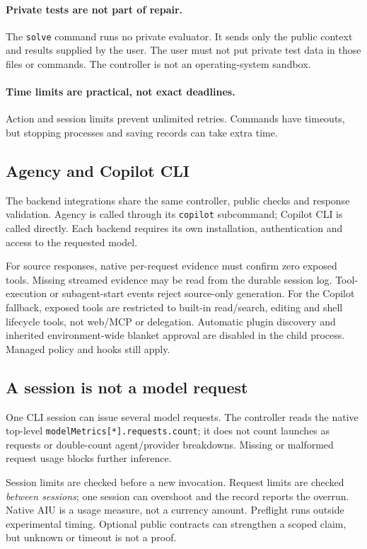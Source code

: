 \documentclass[10pt,twocolumn,a4paper]{article}
\begin{document}
\paragraph{Private tests are not part of repair.}
The \texttt{solve} command runs no private evaluator. It sends only the public
context and results supplied by the user. The user must not put private test
data in those files or commands. The controller is not an operating-system
sandbox.

\paragraph{Time limits are practical, not exact deadlines.}
Action and session limits prevent unlimited retries. Commands have timeouts,
but stopping processes and saving records can take extra time.

\subsection{Agency and Copilot CLI}
The backend integrations share the same controller, public checks and response
validation. Agency is called through its \texttt{copilot} subcommand;
Copilot CLI is called directly. Each backend requires its own installation,
authentication and access to the requested model.

For source responses, native per-request evidence must confirm zero exposed
tools. Missing streamed evidence may be read from the durable session log.
Tool-execution or subagent-start events reject source-only generation.
For the Copilot fallback, exposed tools are restricted to built-in
read/search, editing and shell lifecycle tools, not web/MCP or delegation.
Automatic plugin discovery and inherited environment-wide blanket approval
are disabled in the child process. Managed policy and hooks still apply.

\subsection{A session is not a model request}
One CLI session can issue several model requests. The controller reads the
native top-level \texttt{modelMetrics[*].requests.count}; it does not count
launches as requests or double-count agent/provider breakdowns.
Missing or malformed request usage blocks further inference.

Session limits are checked before a new invocation. Request limits are
checked \emph{between sessions}; one session can overshoot and the record
reports the overrun. Native AIU is a usage measure, not a currency amount.
Preflight runs outside experimental timing. Optional public contracts can
strengthen a scoped claim, but unknown or timeout is not a proof.
\end{document}
